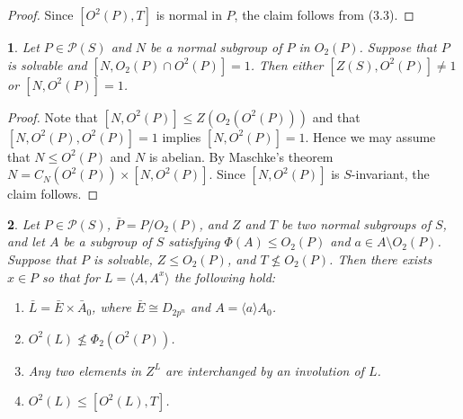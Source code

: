 \documentclass[11pt]{article}
\theoremstyle{plain}
\theoremstyle{stmplain}
\newtheorem{stm}{}[section]
\begin{document}
\begin{proof}
Since $[O^2(P), T]$ is normal in $P$, the claim follows from (3.3).
\end{proof}

\begin{stm}\label{st:3.5}
Let $P \in \mathcal{P}(S)$ and $N$ be a normal subgroup of $P$ in $O_2(P)$.
Suppose that $P$ is solvable and $[N, O_2(P) \cap O^2(P)] = 1$. Then either
$[Z(S), O^2(P)] \ne 1$ or $[N, O^2(P)] = 1$.
\end{stm}

\begin{proof}
Note that $[N, O^2(P)] \le Z(O_2(O^2(P)))$ and that $[N, O^2(P), O^2(P)] = 1$
implies $[N, O^2(P)] = 1$. Hence we may assume that $N \le O^2(P)$ and $N$ is
abelian. By Maschke's theorem $N = C_N(O^2(P)) \times [N, O^2(P)]$. Since
$[N, O^2(P)]$ is $S$-invariant, the claim follows.
\end{proof}

\begin{stm}\label{st:3.6}
Let $P \in \mathcal{P}(S)$, $\bar{P} = P/O_2(P)$, and $Z$ and $T$ be two normal
subgroups of $S$, and let $A$ be a subgroup of $S$ satisfying $\Phi(A) \le
O_2(P)$ and $a \in A \setminus O_2(P)$. Suppose that $P$ is solvable, $Z \le
O_2(P)$, and $T \nleq O_2(P)$. Then there exists $x \in P$ so that for $L =
\langle A, A^x \rangle$ the following hold:
\begin{enumerate}
\item[(a)] $\bar{L} = \bar{E} \times \bar{A}_0$, where $\bar{E} \cong D_{2p^n}$
  and $A = \langle a \rangle A_0$.
\item[(b)] $O^2(L) \nleq \Phi_2(O^2(P))$.
\item[(c)] Any two elements in $Z^L$ are interchanged by an involution of $L$.
\item[(d)] $O^2(L) \le [O^2(L), T]$.
\end{enumerate}
\end{stm}
\end{document}
